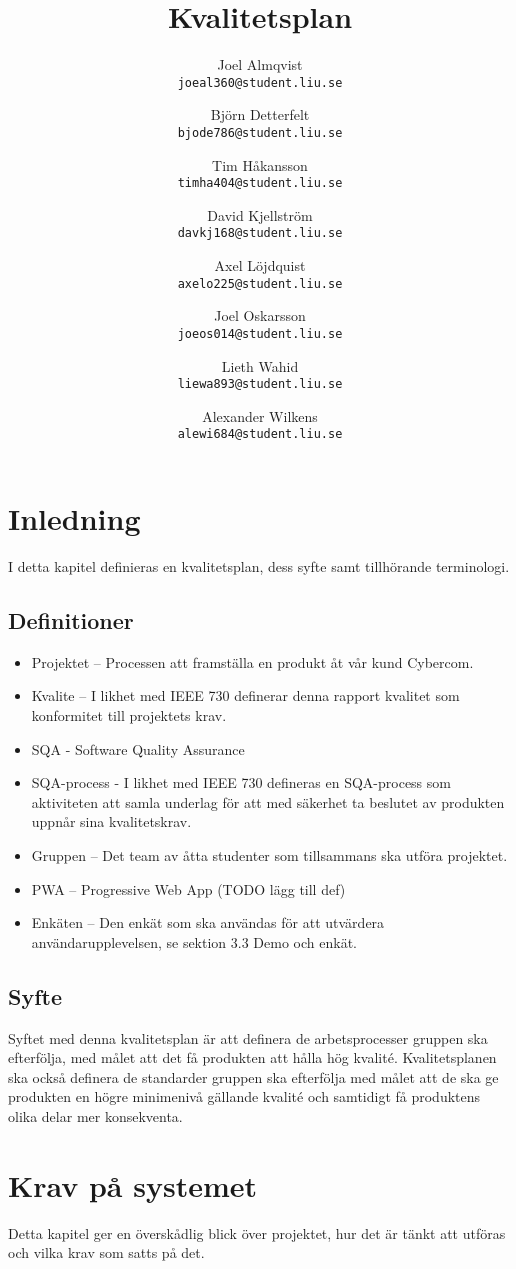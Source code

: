 \documentclass[10pt]{article}
\title{Kvalitetsplan}
\author{
    Joel Almqvist\\
    \texttt{joeal360@student.liu.se}
    \and
    Björn Detterfelt\\
    \texttt{bjode786@student.liu.se}
    \and
    Tim Håkansson\\
    \texttt{timha404@student.liu.se}
    \and
    David Kjellström\\
    \texttt{davkj168@student.liu.se}
    \and
    Axel Löjdquist\\
    \texttt{axelo225@student.liu.se}
    \and
    Joel Oskarsson\\
    \texttt{joeos014@student.liu.se}
    \and
    Lieth Wahid\\
    \texttt{liewa893@student.liu.se}
    \and
    Alexander Wilkens\\
    \texttt{alewi684@student.liu.se}
}
\begin{document}
\maketitle
\pagebreak
\tableofcontents
\pagebreak
\section{Inledning}
	I detta kapitel definieras en kvalitetsplan, dess syfte samt tillhörande terminologi.

	\subsection{Definitioner}
		\begin{itemize}
		\item Projektet -- Processen att framställa en produkt åt vår kund Cybercom.
		\item Kvalite -- I likhet med IEEE 730 definerar denna rapport kvalitet som konformitet till projektets krav.
		\item SQA - Software Quality Assurance
		\item SQA-process - I likhet med IEEE 730 defineras en SQA-process som aktiviteten att samla underlag för att med säkerhet ta beslutet av produkten uppnår sina kvalitetskrav.
		\item Gruppen -- Det team av åtta studenter som tillsammans ska utföra projektet.
		\item PWA -- Progressive Web App (TODO  lägg till def)
		\item Enkäten -- Den enkät som ska användas för att utvärdera användarupplevelsen, se sektion  3.3 Demo och enkät.
		\end{itemize}	
	
	\subsection{Syfte}
		Syftet med denna kvalitetsplan är att definera de arbetsprocesser gruppen ska efterfölja, med målet att det få produkten att hålla hög kvalité. Kvalitetsplanen ska också definera de standarder gruppen ska efterfölja med målet att de ska ge produkten en högre minimenivå gällande kvalité och samtidigt få produktens olika delar mer konsekventa.

		
\pagebreak
\section{Krav på systemet}
	Detta kapitel ger en överskådlig blick över projektet, hur det är tänkt att utföras och vilka krav som satts på det.
\end{document}
